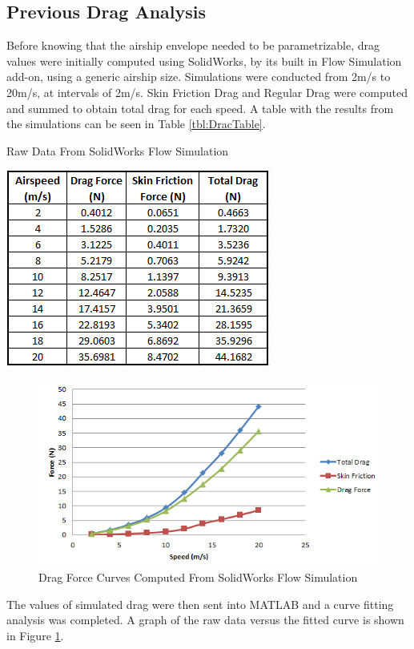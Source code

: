 \documentclass[../main.tex]{subfiles}
\begin{document}
\subsection{Previous Drag Analysis}

Before knowing that the airship envelope needed to be parametrizable, drag values were initially computed using SolidWorks, by its built in Flow Simulation add-on, using a generic airship size. Simulations were conducted from 2m/s to 20m/s, at intervals of 2m/s. Skin Friction Drag and Regular Drag were computed and summed to obtain total drag for each speed. A table with the results from the simulations can be seen in Table \ref{tbl:DracTable}.

\begin{table}[H]
	\centering
	\caption{Raw Data From SolidWorks Flow Simulation}
	\includegraphics[width=.5\linewidth]{img/drag/dragTable.PNG}
	\label{tbl:DracTable}
\end{table}

\begin{figure}[H]
	\centering
	\includegraphics[width=\linewidth]{img/drag/dragForces.PNG}
	\caption{Drag Force Curves Computed From SolidWorks Flow Simulation}
	\label{fig:dragForces}
\end{figure}

The values of simulated drag were then sent into MATLAB and a curve fitting analysis was completed. A graph of the raw data versus the fitted curve is shown in Figure \ref{fig:dragForces}.
\end{document}
